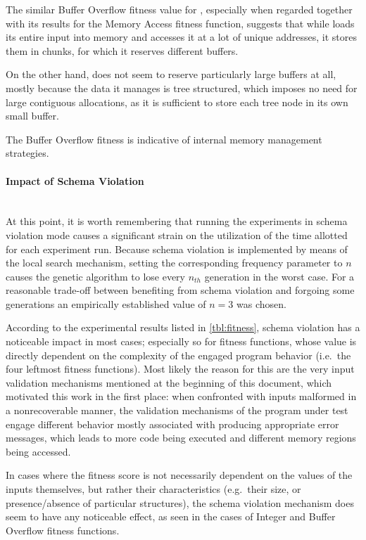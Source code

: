 The similar Buffer Overflow fitness value for \libpng, especially when regarded together with its results for
the Memory Access fitness function, suggests that while \libpng loads its entire input into memory and
accesses it at a lot of unique addresses, it stores them in chunks, for which it reserves different buffers.

On the other hand, \libxml does not seem to reserve particularly large buffers at all, mostly because the data
it manages is tree structured, which imposes no need for large contiguous allocations, as it is sufficient to
store each tree node in its own small buffer.

\begin{mdframed}
\centering
The Buffer Overflow fitness is indicative of internal memory management strategies.
\end{mdframed}

\paragraph{Impact of Schema Violation} ~\\
At this point, it is worth remembering that running the experiments in schema violation mode causes a
significant strain on the utilization of the time allotted for each experiment run. Because schema violation
is implemented by means of the local search mechanism, setting the corresponding frequency parameter to
$n$ causes the genetic algorithm to lose every $n_{th}$ generation in the worst case. For a
reasonable trade-off between benefiting from schema violation and forgoing some generations an empirically
established value of $n=3$ was chosen.

According to the experimental results listed in \cref{tbl:fitness}, schema violation has a noticeable impact in
most cases; especially so for fitness functions, whose value is directly dependent on the complexity of the
engaged program behavior (i.e.\ the four leftmost fitness functions). Most likely the reason for this are the
very input validation mechanisms mentioned at the beginning of this document, which motivated this work in the
first place: when confronted with inputs malformed in a nonrecoverable manner, the validation mechanisms of the
program under test engage different behavior mostly associated with producing appropriate error messages,
which leads to more code being executed and different memory regions being accessed.

In cases where the fitness score is not necessarily dependent on the values of the inputs themselves, but
rather their characteristics (e.g.\ their size, or presence/absence of particular structures), the schema
violation mechanism does seem to have any noticeable effect, as seen in the cases of Integer and Buffer
Overflow fitness functions.

